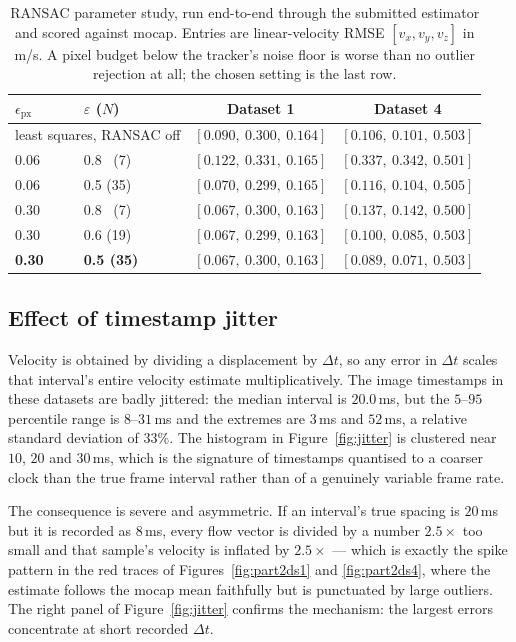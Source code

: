 \documentclass[10pt]{article}
\begin{document}
\begin{table}[htbp]
\centering\small
\caption{RANSAC parameter study, run end-to-end through the submitted estimator and scored against
mocap. Entries are linear-velocity RMSE $[v_x,v_y,v_z]$ in m/s. A pixel budget below the tracker's
noise floor is worse than no outlier rejection at all; the chosen setting is the last row.}
\label{tab:sweep}
\begin{tabular}{llcc}
\toprule
$\epsilon_{\text{px}}$ & $\varepsilon$ ($N$) & Dataset 1 & Dataset 4 \\
\midrule
\multicolumn{2}{l}{least squares, RANSAC off} & $[0.090,\ 0.300,\ 0.164]$ & $[0.106,\ 0.101,\ 0.503]$ \\
\midrule
0.06 & 0.8 \ (7)  & $[0.122,\ 0.331,\ 0.165]$ & $[0.337,\ 0.342,\ 0.501]$ \\
0.06 & 0.5 (35)   & $[0.070,\ 0.299,\ 0.165]$ & $[0.116,\ 0.104,\ 0.505]$ \\
0.30 & 0.8 \ (7)  & $[0.067,\ 0.300,\ 0.163]$ & $[0.137,\ 0.142,\ 0.500]$ \\
0.30 & 0.6 (19)   & $[0.067,\ 0.299,\ 0.163]$ & $[0.100,\ 0.085,\ 0.503]$ \\
\textbf{0.30} & \textbf{0.5 (35)} & $\bm{[0.067,\ 0.300,\ 0.163]}$ & $\bm{[0.089,\ 0.071,\ 0.503]}$ \\
\bottomrule
\end{tabular}
\end{table}

\subsection{Effect of timestamp jitter}
\label{sec:jitter}

Velocity is obtained by dividing a displacement by $\Delta t$, so any error in $\Delta t$ scales that
interval's entire velocity estimate multiplicatively. The image timestamps in these datasets are
badly jittered: the median interval is $20.0\,$ms, but the $5$--$95$ percentile range is
$8$--$31\,$ms and the extremes are $3\,$ms and $52\,$ms, a relative standard deviation of $33\%$.
The histogram in Figure~\ref{fig:jitter} is clustered near $10$, $20$ and $30\,$ms, which is the
signature of timestamps quantised to a coarser clock than the true frame interval rather than of a
genuinely variable frame rate.

The consequence is severe and asymmetric. If an interval's true spacing is $20\,$ms but it is
recorded as $8\,$ms, every flow vector is divided by a number $2.5\times$ too small and that sample's
velocity is inflated by $2.5\times$ --- which is exactly the spike pattern in the red traces of
Figures~\ref{fig:part2ds1} and \ref{fig:part2ds4}, where the estimate follows the mocap mean
faithfully but is punctuated by large outliers. The right panel of Figure~\ref{fig:jitter} confirms
the mechanism: the largest errors concentrate at short recorded $\Delta t$.
\end{document}
